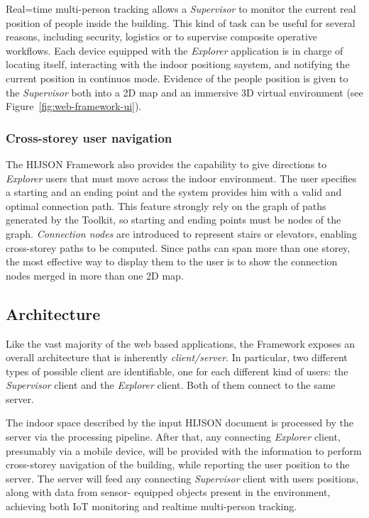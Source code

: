 Real=time multi-person tracking allows a \emph{Supervisor} to monitor the current
real position of people inside the building. This kind of task can be useful for
several reasons, including security, logistics or to supervise composite operative
workflows. Each device equipped with the \emph{Explorer} application is in charge of locating
itself, interacting with the indoor positiong saystem, and notifying the current
position in continuos mode. Evidence of the people position is given to the
\emph{Supervisor} both into a 2D map and an immersive 3D virtual environment (see Figure~\ref{fig:web-framework-ui}).

\subsubsection{Cross-storey user navigation}\label{cross-storey-user-navigation}

The HIJSON Framework also provides the capability to give directions to
\emph{Explorer} users that must move across the indoor environment. The
user specifies a starting and an ending point and the system provides him with
a valid and optimal connection path. This feature
strongly rely on the graph of paths generated by the Toolkit, so starting and
ending points must be nodes of the graph. \emph{Connection nodes} are introduced to
represent stairs or elevators, enabling cross-storey paths to be computed.
Since paths can span more than one storey, the most effective way
to display them to the user is to show the connection nodes merged in more than one 2D map.

\subsection{Architecture}\label{architecture}

Like the vast majority of the web based applications, the Framework exposes an
overall architecture that is inherently \emph{client/server}. In particular,
two different types of possible client are identifiable, one for each different 
kind of users: the \emph{Supervisor} client and the \emph{Explorer} client. 
Both of them connect to the same server.

The indoor space described by the input HIJSON document is
processed by the server via the processing pipeline. After that, any connecting
\emph{Explorer} client, presumably via a mobile device, will be provided
with the information to perform cross-storey navigation of the building, while
reporting the user position to the server. The server will feed any connecting
\emph{Supervisor} client with users positions, along with data from sensor-
equipped objects present in the environment, achieving both IoT monitoring and 
realtime multi-person tracking.

